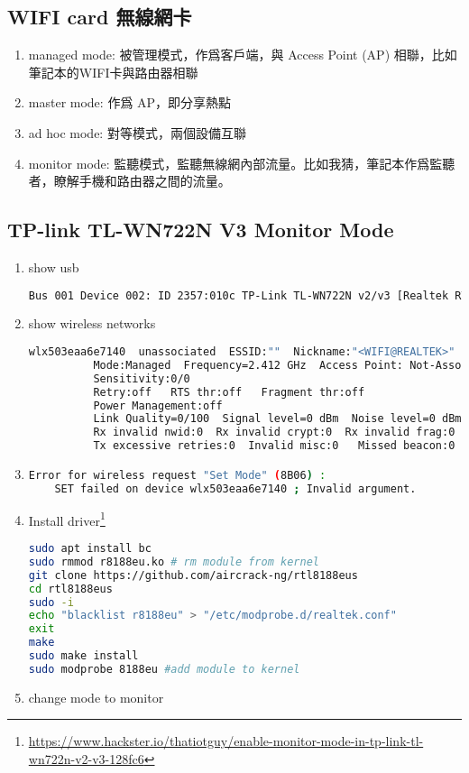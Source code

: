 \subsection{WIFI card 無線網卡}
\begin{enumerate}
\item managed mode: 被管理模式，作爲客戶端，與 Access Point (AP) 相聯，比如筆記本的WIFI卡與路由器相聯 
\item master mode: 作爲 AP，即分享熱點
\item ad hoc mode: 對等模式，兩個設備互聯
\item monitor mode: 監聽模式，監聽無線網內部流量。比如我猜，筆記本作爲監聽者，瞭解手機和路由器之間的流量。
\end{enumerate}

\subsection{TP-link TL-WN722N V3 Monitor Mode}
\begin{enumerate}
\item{} show usb
\begin{lstlisting}[language=bash, caption={lsusb}]
Bus 001 Device 002: ID 2357:010c TP-Link TL-WN722N v2/v3 [Realtek RTL8188EUS]
\end{lstlisting}
\item{} show wireless networks
\begin{lstlisting}[language=bash, caption={iwconfig}]
wlx503eaa6e7140  unassociated  ESSID:""  Nickname:"<WIFI@REALTEK>"
          Mode:Managed  Frequency=2.412 GHz  Access Point: Not-Associated   
          Sensitivity:0/0  
          Retry:off   RTS thr:off   Fragment thr:off
          Power Management:off
          Link Quality=0/100  Signal level=0 dBm  Noise level=0 dBm
          Rx invalid nwid:0  Rx invalid crypt:0  Rx invalid frag:0
          Tx excessive retries:0  Invalid misc:0   Missed beacon:0
\end{lstlisting}
\item{}
\begin{lstlisting}[language=bash, caption={sudo iwconfig wlx503eaa6e7140 mode monitor}]
Error for wireless request "Set Mode" (8B06) :                                                                
    SET failed on device wlx503eaa6e7140 ; Invalid argument.
\end{lstlisting}
\item Install driver\footnote{\url{https://www.hackster.io/thatiotguy/enable-monitor-mode-in-tp-link-tl-wn722n-v2-v3-128fc6}}
\begin{lstlisting}[language=bash, caption={install driver rtl8188eus}]
sudo apt install bc
sudo rmmod r8188eu.ko # rm module from kernel
git clone https://github.com/aircrack-ng/rtl8188eus
cd rtl8188eus
sudo -i
echo "blacklist r8188eu" > "/etc/modprobe.d/realtek.conf"
exit
make
sudo make install
sudo modprobe 8188eu #add module to kernel
\end{lstlisting}
\item{} change mode to monitor
\end{enumerate}
